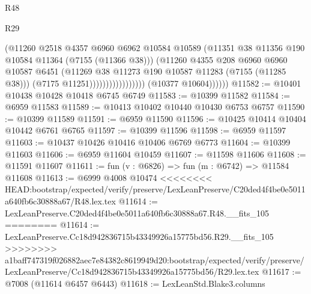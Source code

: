 \begin{lexlean}{R48}
\begin{lexlean}{R29}
\begin{coremodule}
{{{{{{{{{{{{{{{{{{{{{{{{{{{{{{{{{{{{{{{{{{{{{{{{{{{{{{{{{{{{{{{{{{{{{{{{{{{{{{{{{{{{{{{{{{{{{{{{{{{{{{{{{{{{{{{{{{{{{{{{{{{{{{{{{{{{{{{{{{{{{{{{{{{{{{{{{{{{{{{{{{{{{{{{{{{{{{{{{{{{{{{{{{{{{{{{{{{{{{{{{{{{{{{{{{{{{{{{{{                                          (@11260
                                            @2518
                                            @4357
                                            @6960
                                            @6962
                                            @10584
                                            @10589
                                            (@11351
                                              @38
                                              @11356
                                              @190
                                              @10584
                                              @11364
                                              (@7155 (@11366 @38)))
                                            (@11260
                                              @4355
                                              @208
                                              @6960
                                              @6960
                                              @10587
                                              @6451
                                              (@11269
                                                @38
                                                @11273
                                                @190
                                                @10587
                                                @11283
                                                (@7155 (@11285 @38)))
                                              (@7175 @11251)))))))))))))))))
              (@10377 @10604))))))
@11582 := @10401 @10438 @10428 @10418 @6745 @6749
@11583 := @10399 @11582
@11584 := @6959 @11583
@11589 := @10413 @10402 @10440 @10430 @6753 @6757
@11590 := @10399 @11589
@11591 := @6959 @11590
@11596 := @10425 @10414 @10404 @10442 @6761 @6765
@11597 := @10399 @11596
@11598 := @6959 @11597
@11603 := @10437 @10426 @10416 @10406 @6769 @6773
@11604 := @10399 @11603
@11606 := @6959 @11604 @10459
@11607 := @11598 @11606
@11608 := @11591 @11607
@11611 := fun (v : @6826) => fun (m : @6742) => @11584 @11608
@11613 := @6999 @4008 @10474
<<<<<<<< HEAD:bootstrap/expected/verify/preserve/LexLeanPreserve/C20ded4f4be0e5011a640fb6c30888a67/R48.lex.tex
@11614 := LexLeanPreserve.C20ded4f4be0e5011a640fb6c30888a67.R48.__fits_105
========
@11614 := LexLeanPreserve.Cc18d942836715b43349926a15775bd56.R29.__fits_105
>>>>>>>> a1baff747319f026882aec7e84382c8619949d20:bootstrap/expected/verify/preserve/LexLeanPreserve/Cc18d942836715b43349926a15775bd56/R29.lex.tex
@11617 := @7008 (@11614 @6457 @6443)
@11618 := LexLeanStd.Blake3.columns
}}}}}}}}}}}}}}}}}}}}}}}}}}}}}}}}}}}}}}}}}}}}}}}}}}}}}}}}}}}}}}}}}}}}}}}}}}}}}}}}}}}}}}}}}}}}}}}}}}}}}}}}}}}}}}}}}}}}}}}}}}}}}}}}}}}}}}}}}}}}}}}}}}}}}}}}}}}}}}}}}}}}}}}}}}}}}}}}}}}}}}}}}}}}}}}}}}}}}}}}}}}}}}}}}}}}}}}}}}
\end{coremodule}
\end{lexlean}
\end{lexlean}

